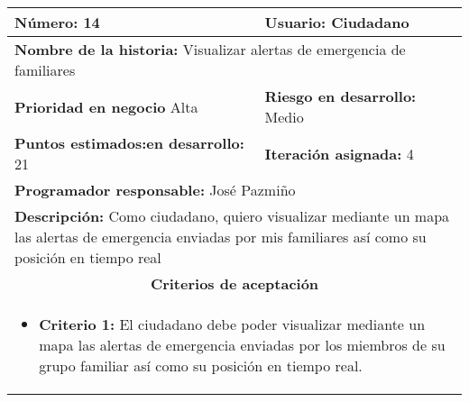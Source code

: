 \begin{longtable}{|p{6.7cm}|p{6.7cm}|}
    \textbf{Número:} 14                                  & \textbf{Usuario:} Ciudadano                                                                                                               \\
    \hline
    \multicolumn{2}{|l|}{\textbf{Nombre de la historia:} Visualizar alertas de emergencia de familiares}                                                                                             \\
    \hline
    \textbf{Prioridad en negocio}  Alta                  & \textbf{Riesgo en desarrollo:} Medio                                                                                                      \\
    \hline
    \textbf{\textbf{Puntos estimados:}en desarrollo:} 21 & \textbf{Iteración asignada:} 4                                                                                                            \\
    \hline
    \multicolumn{2}{|l|}{\textbf{Programador responsable:} José Pazmiño }                                                                                                                            \\
    \hline
    \multicolumn{2}{|p{13.4cm}|}{\textbf{Descripción:} Como ciudadano, quiero visualizar mediante un mapa las alertas de emergencia enviadas por mis familiares así como su posición en tiempo real} \\
    \hline
    \multicolumn{2}{|c|}{\textbf{Criterios de aceptación}}                                                                                                                                           \\
    \hline
    \multicolumn{2}{|p{13.4cm}|}{
    \begin{itemize}[label={},leftmargin=*, nosep]
        \item \textbf{Criterio 1:} El ciudadano debe poder visualizar mediante un mapa las alertas de emergencia enviadas por los miembros de su grupo familiar así como su posición en tiempo real.
    \end{itemize}
    }                                                                                                                                                                                                \\
\end{longtable}



